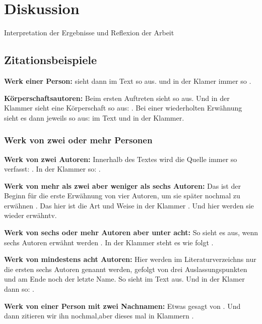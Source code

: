 \chapter{Diskussion}   \label{ch_4}
Interpretation der Ergebnisse und Reflexion der Arbeit

\section{Zitationsbeispiele}

\textbf{Werk einer Person:} sieht dann im Text so aus. \textcite{Hussy2010} und in 
der Klamer immer so \parencite{Hussy2010}.

\textbf{Körperschaftsautoren:} Beim ersten Auftreten sieht \textcite{6.13t} so aus.
Und in der Klammer sieht eine Körperschaft so aus: \parencite{6.13p}. Bei einer 
wiederholten Erwähnung sieht es dann jeweils so aus: \textcite{6.13t} im Text und 
\parencite{6.13p} in der Klammer.


\subsection{Werk von zwei oder mehr Personen}
\textbf{Werk von zwei Autoren:} Innerhalb des Textes wird die Quelle immer so
verfasst: \textcite{Amelang2006}. In der Klammer so: \parencite{Amelang2006}.

\textbf{Werk von mehr als zwei aber weniger als sechs Autoren:} Das ist der Beginn 
für die erste Erwähnung von vier Autoren, um sie später nochmal zu erwähnen 
\textcite{b0424f3eebf64b03a01a8841d7e3bf8d}. Das hier ist die Art und Weise in 
der Klammer \parencite{b0424f3eebf64b03a01a8841d7e3bf8d}. Und hier werden sie 
wieder erwähntv\textcite{b0424f3eebf64b03a01a8841d7e3bf8d}.

\textbf{Werk von sechs oder mehr Autoren aber unter acht:} So sieht es aus, wenn
sechs Autoren erwähnt werden \textcite{doi:10.1026/1616-3443/a000099}. In der
Klammer steht es wie folgt \parencite{doi:10.1026/1616-3443/a000099}.

\textbf{Werk von mindestens acht Autoren:} Hier werden im Literaturverzeichns nur
die ersten sechs Autoren genannt werden, gefolgt von drei Auslassungspunkten
und am Ende noch der letzte Name. So sieht \textcite{ao1} im Text aus. Und in 
der Klamer dann so: \parencite{ao1}.

\textbf{Werk von einer Person mit zwei Nachnamen:} Etwas gesagt von 
\textcite{AQUINOJARQUIN2021}. Und dann zitieren wir ihn nochmal,aber dieses mal in 
Klammern \parencite{AQUINOJARQUIN2021}.

